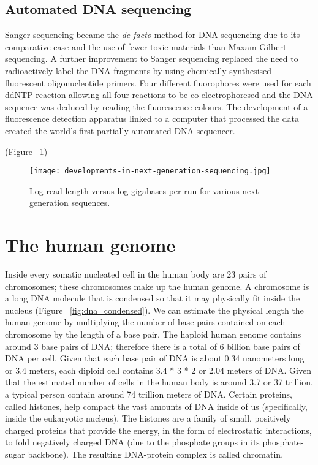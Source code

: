 \subsection{Automated DNA sequencing}

Sanger sequencing became the \textit{de facto} method for DNA sequencing due to its comparative ease and the use of fewer toxic materials than Maxam-Gilbert sequencing. A further improvement to Sanger sequencing replaced the need to radioactively label the DNA fragments by using chemically synthesised fluorescent oligonucleotide primers\cite{pmid3713851}. Four different fluorophores were used for each ddNTP reaction allowing all four reactions to be co-electrophoresed and the DNA sequence was deduced by reading the fluorescence colours. The development of a fluorescence detection apparatus linked to a computer that processed the data created the world's first partially automated DNA sequencer\cite{pmid3713851}.

(Figure ~\ref{fig:dev_next_gen})

\begin{figure}[h]
   \centering
   \texttt{[image: developments-in-next-generation-sequencing.jpg]}
   \caption[Developments in next generation sequencing]{Log read length versus log gigabases per run for various next generation sequences\cite{Nederbragt2012}.}
   \label{fig:dev_next_gen}
\end{figure}

\section{The human genome}

Inside every somatic nucleated cell in the human body are 23 pairs of chromosomes; these chromosomes make up the human genome. A chromosome is a long DNA molecule that is condensed so that it may physically fit inside the nucleus (Figure ~\ref{fig:dna_condensed}). We can estimate the physical length the human genome by multiplying the number of base pairs contained on each chromosome by the length of a base pair. The haploid human genome contains around 3 base pairs of DNA; therefore there is a total of 6 billion base pairs of DNA per cell. Given that each base pair of DNA is about 0.34 nanometers long or 3.4 meters\cite{pmid7354864}, each diploid cell contains 3.4 * 3 * 2 or 2.04 meters of DNA. Given that the estimated number of cells in the human body is around 3.7 or 37 trillion\cite{pmid23829164}, a typical person contain around 74 trillion meters of DNA. Certain proteins, called histones, help compact the vast amounts of DNA inside of us (specifically, inside the eukaryotic nucleus). The histones are a family of small, positively charged proteins that provide the energy, in the form of electrostatic interactions, to fold negatively charged DNA (due to the phosphate groups in its phosphate-sugar backbone). The resulting DNA-protein complex is called chromatin.

